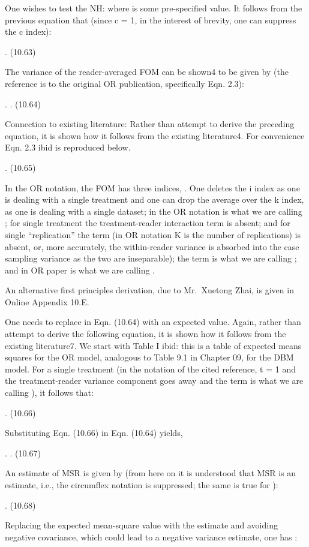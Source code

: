 \documentclass[
]{book}
\begin{document}
One wishes to test the NH: where is some pre-specified value. It follows from the previous equation that (since c = 1, in the interest of brevity, one can suppress the c index):

. (10.63)

The variance of the reader-averaged FOM can be shown4 to be given by (the reference is to the original OR publication, specifically Eqn. 2.3):

. . (10.64)

Connection to existing literature: Rather than attempt to derive the preceding equation, it is shown how it follows from the existing literature4. For convenience Eqn. 2.3 ibid is reproduced below.

. (10.65)

In the OR notation, the FOM has three indices, . One deletes the i index as one is dealing with a single treatment and one can drop the average over the k index, as one is dealing with a single dataset; in the OR notation is what we are calling ; for single treatment the treatment-reader interaction term is absent; and for single ``replication'' the term (in OR notation K is the number of replications) is absent, or, more accurately, the within-reader variance is absorbed into the case sampling variance as the two are inseparable); the term is what we are calling ; and in OR paper is what we are calling .

An alternative first principles derivation, due to Mr.~Xuetong Zhai, is given in Online Appendix 10.E.

One needs to replace in Eqn. (10.64) with an expected value. Again, rather than attempt to derive the following equation, it is shown how it follows from the existing literature7. We start with Table I ibid: this is a table of expected means squares for the OR model, analogous to Table 9.1 in Chapter 09, for the DBM model. For a single treatment (in the notation of the cited reference, t = 1 and the treatment-reader variance component goes away and the term is what we are calling ), it follows that:

. (10.66)

Substituting Eqn. (10.66) in Eqn. (10.64) yields,

. . (10.67)

An estimate of MSR is given by (from here on it is understood that MSR is an estimate, i.e., the circumflex notation is suppressed; the same is true for ):

. (10.68)

Replacing the expected mean-square value with the estimate and avoiding negative covariance, which could lead to a negative variance estimate, one has :
\end{document}

